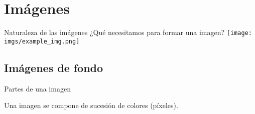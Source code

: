 \section{Imágenes}
\begin{frame}{Naturaleza de las imágenes}
    \centering\Large ¿Qué necesitamos para formar una imagen?
    \texttt{[image: imgs/example\_img.png]}
\end{frame}

\subsection{Imágenes de fondo}
\begin{frame}{Partes de una imagen}
    \begin{block}{}
        \centering{}Una imagen se compone de sucesión de colores (píxeles).
    \end{block}
    \vfill{}
    \begin{columns}
    \begin{column}{0.25\textwidth}
    \end{column}
    \begin{column}{0.05\textwidth}
    \end{column}
    \begin{column}{0.5\textwidth}
    \end{column}
    \begin{column}{0.05\textwidth}
    \end{column}
    \begin{column}{0.25\textwidth}
    \end{column}
    \end{columns}
\end{frame}

